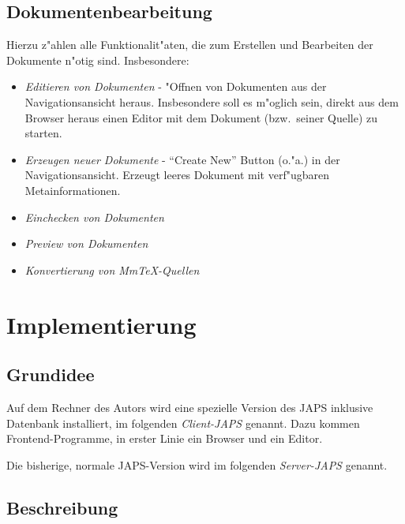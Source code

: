 \documentclass[a4paper,12pt]{article}
\begin{document}
\subsection{Dokumentenbearbeitung}
Hierzu z"ahlen alle Funktionalit"aten, die zum Erstellen und Bearbeiten der Dokumente n"otig
sind. Insbesondere:

\begin{itemize}
\item \emph{Editieren von Dokumenten} - "Offnen von Dokumenten aus der Navigationsansicht
  heraus. Insbesondere soll es m"oglich sein, direkt aus dem Browser heraus einen Editor mit
  dem Dokument (bzw.\ seiner Quelle) zu starten.
\item \emph{Erzeugen neuer Dokumente} - "`Create New"' Button (o."a.) in der
  Navigationsansicht. Erzeugt leeres Dokument mit verf"ugbaren
  Metainformationen.
\item \emph{Einchecken von Dokumenten}
\item \emph{Preview von Dokumenten}
\item \emph{Konvertierung von MmTeX-Quellen}
\end{itemize}


\section{Implementierung}

\subsection{Grundidee}

Auf dem Rechner des Autors wird eine spezielle Version des JAPS inklusive Datenbank
installiert, im folgenden \emph{Client-JAPS} genannt. Dazu kommen Frontend-Programme, in
erster Linie ein Browser und ein Editor.

Die bisherige, normale JAPS-Version wird im folgenden \emph{Server-JAPS} genannt.


\subsection{Beschreibung}
\end{document}

